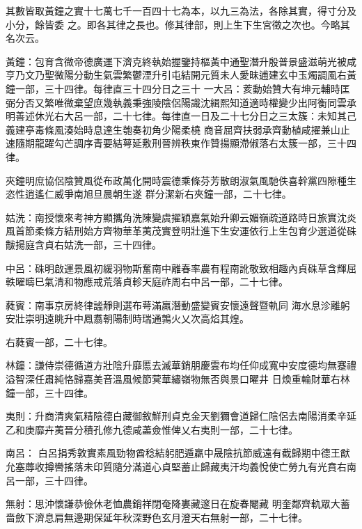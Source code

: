 \begin{pinyinscope}
 其數皆取黃鐘之實十七萬七千一百四十七為本，以九三為法，各除其實，得寸分及小分，餘皆委
 之。即各其律之長也。修其律部，則上生下生宮徵之次也。今略其名次云。



 黃鐘：包育含微帝德廣運下濟克終執始握鑒持樞黃中通聖潛升殷普景盛滋萌光被咸亨乃文乃聖微陽分動生氣雲繁鬱湮升引屯結開元質未人愛昧逋建玄中玉燭調風右黃鐘一部，三十四律。每律直三十四分日之三十
 一大呂：荄動始贊大有坤元輔時匡弼分否又繁唯微棄望庶幾執義秉強陵陰侶陽識沈緝熙知道適時權變少出阿衡同雲承明善述休光右大呂一部，二十七律。每律直一日及二十七分日之三太簇：未知其己義建亭毒條風湊始時息達生匏奏初角少陽柔橈
 商音屈齊扶弱承齊動植咸擢兼山止速隨期龍躍勾芒調序青要結萼延敷刑晉辨秩東作贊揚顯滯俶落右太簇一部，三十四律。



 夾鐘明庶協侶陰贊風從布政萬化開時震德乘條芬芳散朗淑氣風馳佚喜幹黨四隙種生恣性逍遙仁威爭南旭旦晨朝生遂
 群分潔新右夾鐘一部，二十七律。



 姑洗：南授懷來考神方顯攜角洗陳變虞擢穎嘉氣始升卿云媚嶺疏道路時日旅實沈炎風首節柔條方結刑始方齊物華革荑茂實登明壯進下生安運依行上生包育少選道從硃黻揚庭含貞右姑洗一部，三十四律。



 中呂：硃明啟運景風初緩羽物斯奮南中離春率農有程南訛敬致相趣內貞硃草含輝屈軼曜疇巳氣清和物應戒荒落貞軫天庭祚周右中呂一部，二十七律。



 蕤賓：南事京房終律謐靜則選布萼滿羸潛動盛變賓安懷遠聲暨軌同
 海水息沴離躬安壯崇明遠眺升中鳳翥朝陽制時瑞通鶉火乂次高焰其煌。



 右蕤賓一部，二十七律。



 林鐘：謙侍崇德循道方壯陰升靡慝去滅華銷朋慶雲布均任仰成寬中安度德均無蹇禮溢智深任肅純恪歸嘉美音溫風候節蓂華繡嶺物無否與景口曜井
 日煥重輪財華右林鐘一部，三十四律。



 夷則：升商清爽氣精陰德白藏御敘鮮刑貞克金天劉獮會道歸仁陰侶去南陽消柔辛延乙和庚靡卉荑晉分積孔修九德咸藎僉惟俾乂右夷則一部，二十七律。



 南呂：
 白呂捐秀敦實素風勁物酋稔結躬肥遁羸中晟陰抗節威遠有截歸期中德王猷允塞蓐收撙轡搖落未印質隨分滿道心貞堅蓄止歸藏夷汗均義悅使亡勞九有光賁右南呂一部，三十四律。



 無射：思沖懷謙恭儉休老恤農銷祥閉奄降婁藏邃日在旋春閹藏
 明奎鄰齊軌眾大蓄嗇斂下濟息肩無邊期保延年秋深野色玄月澄天右無射一部，二十七律。




\end{pinyinscope}
